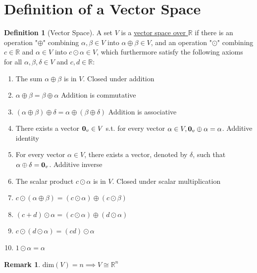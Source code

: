 \documentclass{article}
\theoremstyle{definition}
\newtheorem*{remark}{Remark}
\newtheorem{definition}{Definition}
\newcommand{\reals}{\mathbb{R}}
\begin{document}
\section{Definition of a Vector Space}
	\begin{definition}[Vector Space]
		A set $V$ is a \underline{vector space over $\reals$} if there is an operation "$\oplus$" combining $\alpha, \beta \in V$ into $\alpha \oplus \beta \in V$, and an operation "$\odot$" combining $c \in \reals$ and $\alpha \in V$ into $c \odot \alpha \in V$, which furthermore satisfy the following axioms for all $\alpha, \beta, \delta \in V$ and $c,d \in \reals$:
		
		\begin{enumerate}[font=\bfseries, itemsep=0pt]
			\item The sum $\alpha \oplus \beta$ is in $V$. \hfill Closed under addition
			\item $\alpha \oplus \beta = \beta \oplus \alpha$ \hfill Addition is commutative
			\item $(\alpha \oplus \beta) \oplus \delta = \alpha \oplus (\beta \oplus \delta)$ \hfill Addition is associative
			\item There exists a vector $\vb{0}_v \in V$ s.t. for every vector $\alpha \in V, \vb{0}_v \oplus \alpha = \alpha$. \hfill Additive identity
			\item For every vector $\alpha \in V$, there exists a vector, denoted by $\delta$, such that $\alpha \oplus \delta = \vb{0}_v$. \hfill Additive inverse
			\item The scalar product $c \odot \alpha$ is in $V$. \hfill Closed under scalar multiplication
			\item $c \odot (\alpha \oplus \beta) = (c \odot \alpha) \oplus (c \odot \beta)$
			\item $(c + d) \odot \alpha = (c \odot \alpha) \oplus (d \odot \alpha)$
			\item $c \odot (d \odot \alpha) = (cd)\odot \alpha$
			\item $1 \odot \alpha = \alpha$
		\end{enumerate}
	\end{definition}

	\begin{remark}
		$\text{dim}(V) = n \implies V \cong \reals^n$
	\end{remark}
\end{document}
